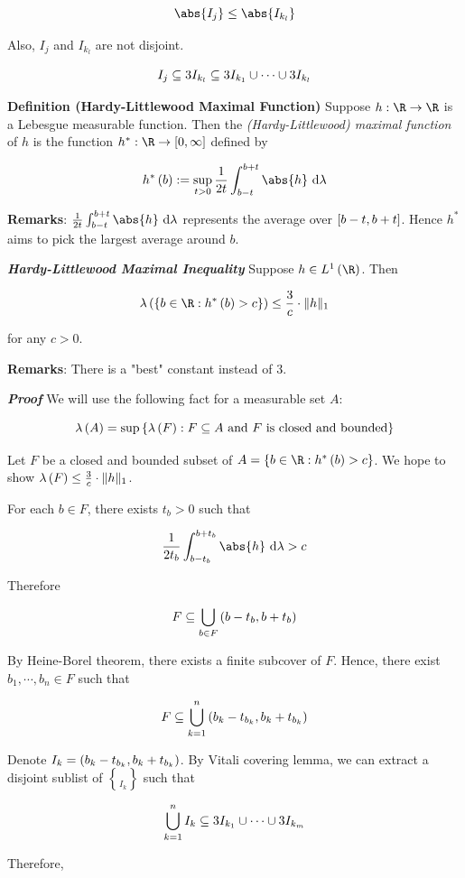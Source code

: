 \documentclass[
]{article}
\begin{document}
\[\abs{I_j}\le\abs{I_{k_l}}\]

Also, \(I_j\) and \(I_{k_l}\) are not disjoint.

\[I_j\subseteq 3I_{k_l}\subseteq 3I_{k_1}\cup \cdots\cup 3I_{k_l}\]

\textbf{Definition (Hardy-Littlewood Maximal Function)} Suppose
\(h:\R\to \R\) is a Lebesgue measurable function. Then the
\emph{(Hardy-Littlewood) maximal function} of \(h\) is the function
\(h^*:\R\to \br{0,\infty}\) defined by

\[h^*\pr b:= \sup_{t>0}\frac1{2t}\int_{b-t}^{b+t}\abs{h}\d\lambda\]

\textbf{Remarks}: \(\frac1{2t}\int_{b-t}^{b+t}\abs{h}\d\lambda\)
represents the average over \(\left[b-t,b+t\right]\). Hence \(h^*\) aims to pick
the largest average around \(b\).

\emph{\textbf{Hardy-Littlewood Maximal Inequality}} Suppose
\(h\in L^1\pr{\R}\). Then

\[\lambda\pr{\brace{b\in \R:h^*\pr{b}>c}}\le \frac3c \cdot\norm{h}\]

for any \(c>0\).

\textbf{Remarks}: There is a "best" constant instead of \(3\).

\emph{\textbf{Proof}} We will use the following fact for a measurable
set \(A\):

\[\lambda\left(A\right) = \sup\left\{\lambda\left(F\right):F\subseteq A\text{ and }F \text{ is closed and bounded}\right\}\]

Let \(F\) be a closed and bounded subset of
\(A = \brace{b\in \R:h^*\pr b>c}\). We hope to show
\(\lambda\left(F\right)\le\frac3c\cdot\|{h}\|_{1}\).

For each \(b\in F\), there exists \(t_b>0\) such that

\[\frac1{2t_b}\int_{b-t_b}^{b+t_b}\abs{h}\d \lambda >c\]

Therefore

\[F\subseteq \bigcup_{b\in F}\left(b-t_b,b+t_b\right)\]

By Heine-Borel theorem, there exists a finite subcover of \(F\). Hence,
there exist \(b_1,\cdots,b_n\in F\) such that

\[F\subseteq \bigcup_{k = 1}^n\left(b_k-t_{b_k},b_{k}+t_{b_k}\right)\]

Denote \(I_k = \left(b_k-t_{b_k},b_{k}+t_{b_k}\right)\). By Vitali covering
lemma, we can extract a disjoint sublist of \(\brace{I_k}\) such that

\[\bigcup_{k = 1}^nI_k\subseteq 3I_{k_1}\cup\cdots\cup 3I_{k_m}\]

Therefore,
\end{document}

